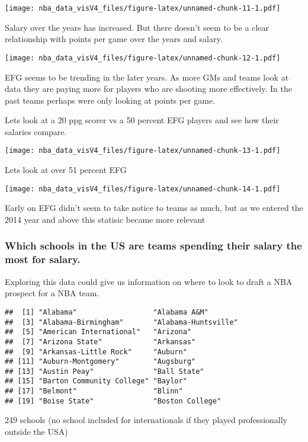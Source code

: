 \documentclass[]{article}
\begin{document}
\texttt{[image: nba\_data\_visV4\_files/figure-latex/unnamed-chunk-11-1.pdf]}

Salary over the years has increased. But there doesn't seem to be a
clear relationship with points per game over the years and salary.

\texttt{[image: nba\_data\_visV4\_files/figure-latex/unnamed-chunk-12-1.pdf]}

EFG seems to be trending in the later years. As more GMs and teams look
at data they are paying more for players who are shooting more
effectively. In the past teams perhaps were only looking at points per
game.

Lets look at a 20 ppg scorer vs a 50 percent EFG players and see how
their salaries compare.

\texttt{[image: nba\_data\_visV4\_files/figure-latex/unnamed-chunk-13-1.pdf]}

Lets look at over 51 percent EFG

\texttt{[image: nba\_data\_visV4\_files/figure-latex/unnamed-chunk-14-1.pdf]}

Early on EFG didn't seem to take notice to teams as much, but as we
entered the 2014 year and above this statisic became more relevant

\subsubsection{Which schools in the US are teams spending their salary
the most for
salary.}\label{which-schools-in-the-us-are-teams-spending-their-salary-the-most-for-salary.}

Exploring this data could give us information on where to look to draft
a NBA prospect for a NBA team.

\begin{verbatim}
##  [1] "Alabama"                  "Alabama A&M"             
##  [3] "Alabama-Birmingham"       "Alabama-Huntsville"      
##  [5] "American International"   "Arizona"                 
##  [7] "Arizona State"            "Arkansas"                
##  [9] "Arkansas-Little Rock"     "Auburn"                  
## [11] "Auburn-Montgomery"        "Augsburg"                
## [13] "Austin Peay"              "Ball State"              
## [15] "Barton Community College" "Baylor"                  
## [17] "Belmont"                  "Blinn"                   
## [19] "Boise State"              "Boston College"
\end{verbatim}

249 schools (no school included for internationals if they played
professionally outside the USA)
\end{document}
